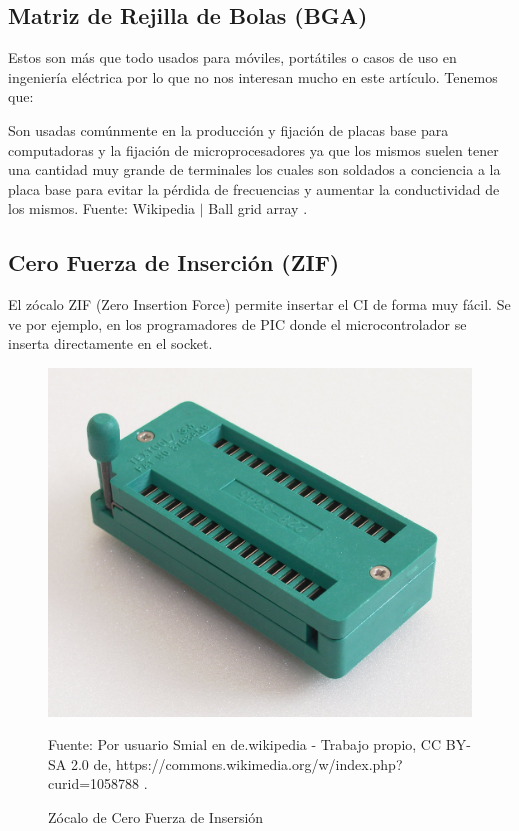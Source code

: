 \documentclass[conference]{IEEEtran}
\begin{document}
\subsection{Matriz de Rejilla de Bolas (BGA)}

Estos son más que todo usados para móviles, portátiles o casos de uso en ingeniería eléctrica \cite{wikipedia-bga-2021B} por lo que no nos interesan mucho en este artículo. Tenemos que:

\begin{displayquote}
    Son usadas comúnmente en la producción y fijación de placas base para computadoras y la fijación de microprocesadores ya que los mismos suelen tener una cantidad muy grande de terminales los cuales son soldados a conciencia a la placa base para evitar la pérdida de frecuencias y aumentar la conductividad de los mismos.
    \small
    Fuente: Wikipedia $\mid$ Ball grid array \cite{wikipedia-bga-2021B}.
\end{displayquote}

\subsection{Cero Fuerza de Inserción (ZIF)}

El zócalo ZIF (Zero Insertion Force) permite insertar el CI de forma muy fácil. Se ve por ejemplo, en los programadores de PIC donde el microcontrolador se inserta directamente en el socket.

\begin{figure}[H]
    \centering
    \includegraphics[width=0.2\paperwidth]{images/zif-socket.jpg}
    \caption{Zócalo de Cero Fuerza de Insersión} \footnotesize
    Fuente: Por usuario Smial en de.wikipedia - Trabajo propio, CC BY-SA 2.0 de, https://commons.wikimedia.org/w/index.php?curid=1058788 \cite{wikipedia-zif-2021}.
\end{figure}
\end{document}

